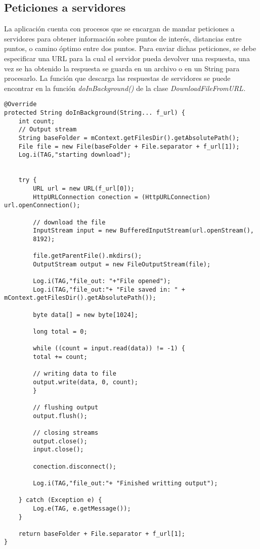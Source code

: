 \subsection{Peticiones a servidores}
La aplicación cuenta con procesos que se encargan de mandar peticiones a servidores para obtener información sobre puntos de interés, distancias entre puntos, o camino óptimo entre dos puntos. Para enviar dichas peticiones, se debe especificar una URL para la cual el servidor pueda devolver una respuesta, una vez se ha obtenido la respuesta se guarda en un archivo o en un String para procesarlo. La función que descarga las respuestas de servidores se puede encontrar en la función \textit{doInBackground()} de la clase \textit{DownloadFileFromURL.}
\begin{lstlisting}[caption=Función para enviar peticiones a servidores y guardar respuesta]
@Override
protected String doInBackground(String... f_url) {
	int count;
	// Output stream
	String baseFolder = mContext.getFilesDir().getAbsolutePath();
	File file = new File(baseFolder + File.separator + f_url[1]);
	Log.i(TAG,"starting download");
	
	
	try {
		URL url = new URL(f_url[0]);
		HttpURLConnection conection = (HttpURLConnection) url.openConnection();
		
		// download the file
		InputStream input = new BufferedInputStream(url.openStream(),
		8192);
		
		file.getParentFile().mkdirs();
		OutputStream output = new FileOutputStream(file);
		
		Log.i(TAG,"file_out: "+"File opened");
		Log.i(TAG,"file_out:"+ "File saved in: " + mContext.getFilesDir().getAbsolutePath());
		
		byte data[] = new byte[1024];
		
		long total = 0;
		
		while ((count = input.read(data)) != -1) {
		total += count;
		
		// writing data to file
		output.write(data, 0, count);
		}
		
		// flushing output
		output.flush();
		
		// closing streams
		output.close();
		input.close();
		
		conection.disconnect();
		
		Log.i(TAG,"file_out:"+ "Finished writting output");
	
	} catch (Exception e) {
		Log.e(TAG, e.getMessage());
	}
	
	return baseFolder + File.separator + f_url[1];
}
\end{lstlisting}

